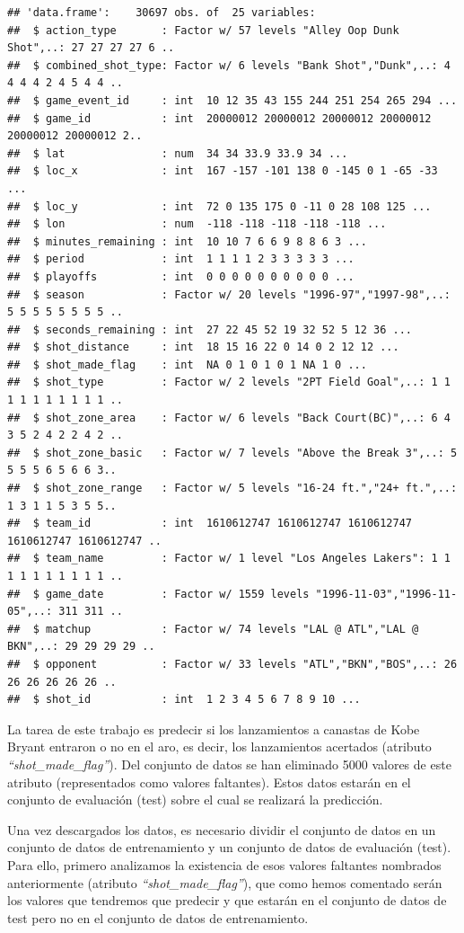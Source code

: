 \documentclass[
]{article}
\begin{document}
\begin{verbatim}
## 'data.frame':    30697 obs. of  25 variables:
##  $ action_type       : Factor w/ 57 levels "Alley Oop Dunk Shot",..: 27 27 27 27 6 ..
##  $ combined_shot_type: Factor w/ 6 levels "Bank Shot","Dunk",..: 4 4 4 4 2 4 5 4 4 ..
##  $ game_event_id     : int  10 12 35 43 155 244 251 254 265 294 ...
##  $ game_id           : int  20000012 20000012 20000012 20000012 20000012 20000012 2..
##  $ lat               : num  34 34 33.9 33.9 34 ...
##  $ loc_x             : int  167 -157 -101 138 0 -145 0 1 -65 -33 ...
##  $ loc_y             : int  72 0 135 175 0 -11 0 28 108 125 ...
##  $ lon               : num  -118 -118 -118 -118 -118 ...
##  $ minutes_remaining : int  10 10 7 6 6 9 8 8 6 3 ...
##  $ period            : int  1 1 1 1 2 3 3 3 3 3 ...
##  $ playoffs          : int  0 0 0 0 0 0 0 0 0 0 ...
##  $ season            : Factor w/ 20 levels "1996-97","1997-98",..: 5 5 5 5 5 5 5 5 ..
##  $ seconds_remaining : int  27 22 45 52 19 32 52 5 12 36 ...
##  $ shot_distance     : int  18 15 16 22 0 14 0 2 12 12 ...
##  $ shot_made_flag    : int  NA 0 1 0 1 0 1 NA 1 0 ...
##  $ shot_type         : Factor w/ 2 levels "2PT Field Goal",..: 1 1 1 1 1 1 1 1 1 1 ..
##  $ shot_zone_area    : Factor w/ 6 levels "Back Court(BC)",..: 6 4 3 5 2 4 2 2 4 2 ..
##  $ shot_zone_basic   : Factor w/ 7 levels "Above the Break 3",..: 5 5 5 5 6 5 6 6 3..
##  $ shot_zone_range   : Factor w/ 5 levels "16-24 ft.","24+ ft.",..: 1 3 1 1 5 3 5 5..
##  $ team_id           : int  1610612747 1610612747 1610612747 1610612747 1610612747 ..
##  $ team_name         : Factor w/ 1 level "Los Angeles Lakers": 1 1 1 1 1 1 1 1 1 1 ..
##  $ game_date         : Factor w/ 1559 levels "1996-11-03","1996-11-05",..: 311 311 ..
##  $ matchup           : Factor w/ 74 levels "LAL @ ATL","LAL @ BKN",..: 29 29 29 29 ..
##  $ opponent          : Factor w/ 33 levels "ATL","BKN","BOS",..: 26 26 26 26 26 26 ..
##  $ shot_id           : int  1 2 3 4 5 6 7 8 9 10 ...
\end{verbatim}

La tarea de este trabajo es predecir si los lanzamientos a canastas de
Kobe Bryant entraron o no en el aro, es decir, los lanzamientos
acertados (atributo \emph{``shot\_made\_flag''}). Del conjunto de datos
se han eliminado 5000 valores de este atributo (representados como
valores faltantes). Estos datos estarán en el conjunto de evaluación
(test) sobre el cual se realizará la predicción.

\newpage

Una vez descargados los datos, es necesario dividir el conjunto de datos
en un conjunto de datos de entrenamiento y un conjunto de datos de
evaluación (test). Para ello, primero analizamos la existencia de esos
valores faltantes nombrados anteriormente (atributo
\emph{``shot\_made\_flag''}), que como hemos comentado serán los valores
que tendremos que predecir y que estarán en el conjunto de datos de test
pero no en el conjunto de datos de entrenamiento.
\end{document}
